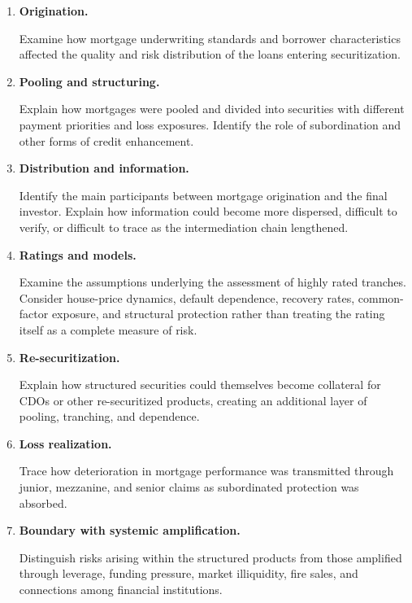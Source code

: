 \begin{enumerate}

\item \textbf{Origination.}

Examine how mortgage underwriting standards and borrower characteristics affected the quality and risk distribution of the loans entering securitization.

\item \textbf{Pooling and structuring.}

Explain how mortgages were pooled and divided into securities with different payment priorities and loss exposures. Identify the role of subordination and other forms of credit enhancement.

\item \textbf{Distribution and information.}

Identify the main participants between mortgage origination and the final investor. Explain how information could become more dispersed, difficult to verify, or difficult to trace as the intermediation chain lengthened.

\item \textbf{Ratings and models.}

Examine the assumptions underlying the assessment of highly rated tranches. Consider house-price dynamics, default dependence, recovery rates, common-factor exposure, and structural protection rather than treating the rating itself as a complete measure of risk.

\item \textbf{Re-securitization.}

Explain how structured securities could themselves become collateral for CDOs or other re-securitized products, creating an additional layer of pooling, tranching, and dependence.

\item \textbf{Loss realization.}

Trace how deterioration in mortgage performance was transmitted through junior, mezzanine, and senior claims as subordinated protection was absorbed.

\item \textbf{Boundary with systemic amplification.}

Distinguish risks arising within the structured products from those amplified through leverage, funding pressure, market illiquidity, fire sales, and connections among financial institutions.

\end{enumerate}



